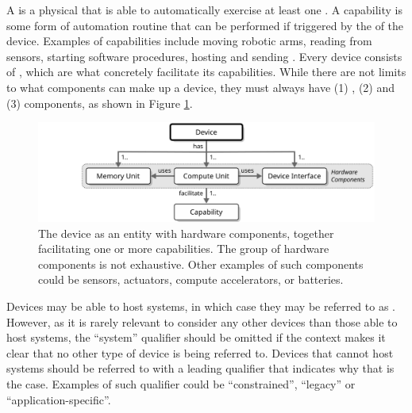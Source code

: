 A  is a physical  that is able to automatically exercise at least one .
A capability is some form of automation routine that can be performed if triggered by the  of the device.
Examples of capabilities include moving robotic arms, reading from sensors, starting software procedures, hosting  and sending . 
Every device consists of , which are what concretely facilitate its capabilities.
While there are not limits to what components can make up a device, they must always have (1) , (2)  and (3)  components, as shown in Figure \ref{fig:device}.

\begin{figure}[ht!]
  \centering
  \includegraphics[scale=0.9]{figures/device}
  \caption{
    The device as an entity with hardware components, together facilitating one or more capabilities.
    The group of hardware components is not exhaustive.
    Other examples of such components could be sensors, actuators, compute accelerators, or batteries.
  }
  \label{fig:device}
\end{figure}

\vspace*{2mm}

Devices may be able to host systems, in which case they may be referred to as .
However, as it is rarely relevant to consider any other devices than those able to host systems, the ``system'' qualifier should be omitted if the context makes it clear that no other type of device is being referred to.
Devices that cannot host systems should be referred to with a leading qualifier that indicates why that is the case.
Examples of such qualifier could be ``constrained'', ``legacy'' or ``application-specific''.


